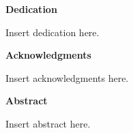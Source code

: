 
\begingroup
\centering

\textbf{Dedication}

\flushleft

Insert dedication here. \lipsum[1]

\endgroup

\clearpage


\begingroup
\centering

\textbf{Acknowledgments} %

\flushleft

Insert acknowledgments here. \lipsum[2]

\endgroup

\clearpage


\begingroup
\centering

\textbf{Abstract}

\flushleft

Insert abstract here. \lipsum[1]

\endgroup

\clearpage


\tableofcontents

\listoffigures

\listoftables

\clearpage

